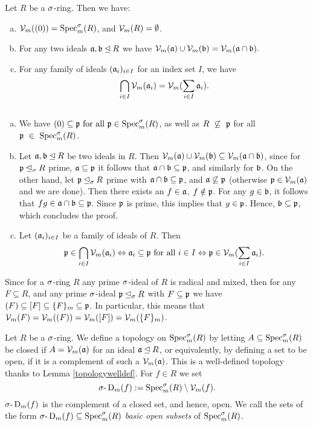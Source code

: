 \begin{lem}\label{topologywelldef}
Let $R$ be a $\sigma$-ring. Then we have:
\begin{enumerate}[(a)]
\item $\mathcal{V}_m((0)) = \operatorname{Spec}^\sigma_m(R)$, and $\mathcal{V}_m(R) = \emptyset$.
\item For any two ideals $\mathfrak{a},\mathfrak{b} \unlhd R$ we have $\mathcal{V}_m(\mathfrak{a}) \cup \mathcal{V}_m(\mathfrak{b}) = \mathcal{V}_m(\mathfrak{a} \cap \mathfrak{b}).$
\item For any family of ideals $(\mathfrak{a}_i)_{i \in I}$ for an index set $I$, we have $$\bigcap_{i \in I} \mathcal{V}_m(\mathfrak{a}_i) = \mathcal{V}_m(\sum_{i \in I} \mathfrak{a}_i).$$ \label{vmintersectionideals}
\end{enumerate}
\begin{bew} $~$
\begin{enumerate}[(a)]
\item We have $(0) \subseteq \mathfrak{p} \text{ for all } \mathfrak{p} \in \operatorname{Spec}^\sigma_m(R)$, as well as $R~\not\subseteq~\mathfrak{p} $ for all $\mathfrak{p}~\in~\operatorname{Spec}^\sigma_m(R)$.
\item Let $\mathfrak{a}, \mathfrak{b} \unlhd R$ be two ideals in $R$. Then $\mathcal{V}_m(\mathfrak{a}) \cup \mathcal{V}_m(\mathfrak{b}) \subseteq \mathcal{V}_m(\mathfrak{a} \cap \mathfrak{b})$, since for $\mathfrak{p} \unlhd_{\sigma} R$ prime, $\mathfrak{a} \subseteq \mathfrak{p}$ it follows that $\mathfrak{a} \cap \mathfrak{b} \subseteq \mathfrak{p}$, and similarly for $\mathfrak{b}$.
On the other hand, let $\mathfrak{p} \unlhd_{\sigma} R$ prime with $\mathfrak{a} \cap \mathfrak{b} \subseteq \mathfrak{p}$, and $\mathfrak{a} \not\subseteq \mathfrak{p}$ (otherwise $\mathfrak{p} \in \mathcal{V}_m(\mathfrak{a})$ and we are done). Then there exists an $f \in \mathfrak{a}$, $f \notin \mathfrak{p}$. 
For any $g \in \mathfrak{b}$, it follows that $fg \in \mathfrak{a} \cap \mathfrak{b} \subseteq \mathfrak{p}$. Since $\mathfrak{p}$ is prime, this implies that $g \in \mathfrak{p}$. Hence, $\mathfrak{b} \subseteq \mathfrak{p}$, which concludes the proof.
\item Let $(\mathfrak{a}_i)_{i \in I}$ be a family  of ideals of $R$. Then $$\mathfrak{p} \in \bigcap_{i \in I} \mathcal{V}_m(\mathfrak{a}_i) \Leftrightarrow \mathfrak{a}_i \subseteq \mathfrak{p} \text{ for all } i \in I \Leftrightarrow \mathfrak{p} \in \mathcal{V}_m(\sum_{i \in I} \mathfrak{a}_i).$$
\end{enumerate}
\end{bew}
\end{lem}


\begin{rem}\label{vmsequal}
Since for a $\sigma$-ring $R$ any prime $\sigma$-ideal of $R$ is radical and mixed, then for any $F \subseteq R$, and any prime $\sigma$-ideal $\mathfrak{p} \unlhd_{\sigma} R$ with $F \subseteq \mathfrak{p}$ we have
$(F) \subseteq [F] \subseteq \{ F \}_m \subseteq \mathfrak{p}$. In particular, this means that $\mathcal{V}_m(F) = \mathcal{V}_m((F)) = \mathcal{V}_m([F]) = \mathcal{V}_m(\{F\}_m)$. 
\end{rem}

\begin{defn}\label{deftop}
Let $R$ be a $\sigma$-ring. We define a topology on $\operatorname{Spec}^\sigma_m(R)$ by letting $A \subseteq \operatorname{Spec}^\sigma_m(R)$ be closed if $A = \mathcal{V}_m(\mathfrak{a})$ for an ideal $\mathfrak{a} \unlhd R$, or equivalently,
 by defining a set to be open, if it is a complement of such a $\mathcal{V}_m(\mathfrak{a})$. This is a well-defined topology thanks to Lemma \ref{topologywelldef}.
For $f \in R$ we set $$\sigma\text{-}\operatorname{D}_m(f):= \operatorname{Spec}^\sigma_m(R) \setminus \mathcal{V}_m(f).$$ $\sigma\text{-}\operatorname{D}_m(f)$ is the complement of a closed set, and hence, open. 
We call the sets of the form $\sigma\text{-}\operatorname{D}_m(f) \subseteq \operatorname{Spec}^\sigma_m(R)$ \emph{basic open subsets} of $\operatorname{Spec}^\sigma_m(R)$. 
\end{defn}

